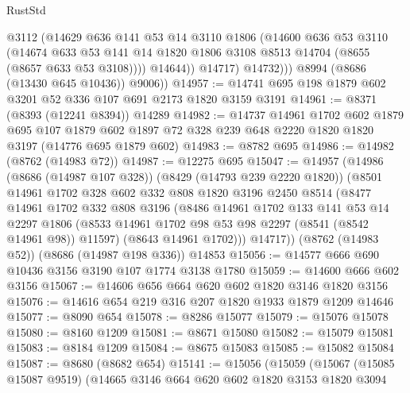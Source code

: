 \begin{lexlean}{RustStd}
\begin{coremodule}
                  @3112
                  (@14629
                    @636
                    @141
                    @53
                    @14
                    @3110
                    @1806
                    (@14600
                      @636
                      @53
                      @3110
                      (@14674
                        @633
                        @53
                        @141
                        @14
                        @1820
                        @1806
                        @3108
                        @8513
                        @14704
                        (@8655 (@8657 @633 @53 @3108))))
                    @14644))
                @14717)
              @14732)))
        @8994
        (@8686 (@13430 @645 @10436))
        @9006))
@14957 := @14741 @695 @198 @1879 @602 @3201 @52 @336 @107 @691 @2173 @1820 @3159 @3191
@14961 := @8371 (@8393 (@12241 @8394)) @14289
@14982 := @14737
    @14961
    @1702
    @602
    @1879
    @695
    @107
    @1879
    @602
    @1897
    @72
    @328
    @239
    @648
    @2220
    @1820
    @1820
    @3197
    (@14776 @695 @1879 @602)
@14983 := @8782 @695
@14986 := @14982 (@8762 (@14983 @72))
@14987 := @12275 @695
@15047 := @14957
    (@14986
      (@8686 (@14987 @107 @328))
      (@8429 (@14793 @239 @2220 @1820))
      (@8501
        @14961
        @1702
        @328
        @602
        @332
        @808
        @1820
        @3196
        @2450
        @8514
        (@8477
          @14961
          @1702
          @332
          @808
          @3196
          (@8486
            @14961
            @1702
            @133
            @141
            @53
            @14
            @2297
            @1806
            (@8533 @14961 @1702 @98 @53 @98 @2297 (@8541 (@8542 @14961 @98)) @11597)
            (@8643 @14961 @1702)))
        @14717))
    (@8762 (@14983 @52))
    (@8686 (@14987 @198 @336))
    @14853
@15056 := @14577 @666 @690 @10436 @3156 @3190 @107 @1774 @3138 @1780
@15059 := @14600 @666 @602 @3156
@15067 := @14606 @656 @664 @620 @602 @1820 @3146 @1820 @3156
@15076 := @14616 @654 @219 @316 @207 @1820 @1933 @1879 @1209 @14646
@15077 := @8090 @654
@15078 := @8286 @15077
@15079 := @15076 @15078
@15080 := @8160 @1209
@15081 := @8671 @15080
@15082 := @15079 @15081
@15083 := @8184 @1209
@15084 := @8675 @15083
@15085 := @15082 @15084
@15087 := @8680 (@8682 @654)
@15141 := @15056
    (@15059
      (@15067
        (@15085 @15087 @9519)
        (@14665
          @3146
          @664
          @620
          @602
          @1820
          @3153
          @1820
          @3094

\end{coremodule}
\end{lexlean}
